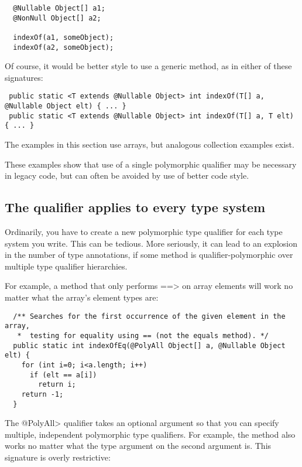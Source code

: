 \begin{Verbatim}
  @Nullable Object[] a1;
  @NonNull Object[] a2;

  indexOf(a1, someObject);
  indexOf(a2, someObject);
\end{Verbatim}

Of course, it would be better style to use a generic method, as in either
of these signatures:

\begin{Verbatim}
 public static <T extends @Nullable Object> int indexOf(T[] a, @Nullable Object elt) { ... }
 public static <T extends @Nullable Object> int indexOf(T[] a, T elt) { ... }
\end{Verbatim}

The examples in this section use arrays, but analogous collection examples exist.

These examples show that use of a single polymorphic qualifier may be
necessary in legacy code, but can often be avoided by use of better code
style.


\subsection{The  qualifier applies to every type system\label{polyall}}

Ordinarily, you have to create a new polymorphic type qualifier for each
type system you write.  This can be tedious.  More seriously, it can lead
to an explosion in the number of type annotations, if some method is
qualifier-polymorphic over multiple type qualifier hierarchies.

For example, a method that only performs \<==> on array elements will work
no matter what the array's element types are:

\begin{Verbatim}
  /** Searches for the first occurrence of the given element in the array,
   *  testing for equality using == (not the equals method). */
  public static int indexOfEq(@PolyAll Object[] a, @Nullable Object elt) {
    for (int i=0; i<a.length; i++)
      if (elt == a[i])
        return i;
    return -1;
  }
\end{Verbatim}

The \<@PolyAll> qualifier takes an optional argument so that you can
specify multiple, independent polymorphic type qualifiers.  For example,
the method also works no matter what the type argument on the second
argument is.  This signature is overly restrictive:

